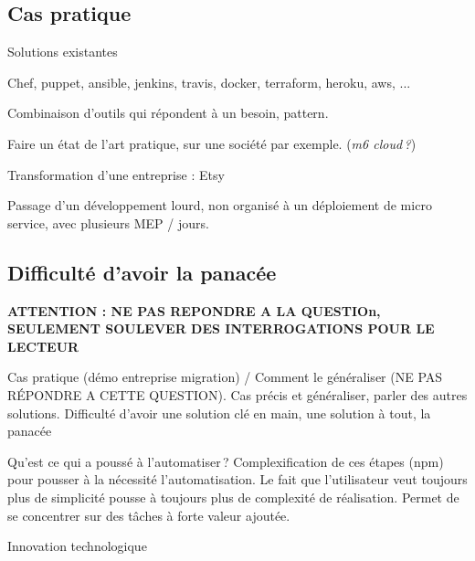 \subsection{Cas pratique}

Solutions existantes

Chef, puppet, ansible, jenkins, travis, docker, terraform, heroku, aws, ...

Combinaison d'outils qui répondent à un besoin, pattern.


Faire un état de l'art pratique, sur une société par exemple. (\textit{m6 cloud ?})

Transformation d'une entreprise : Etsy

Passage d'un développement lourd, non organisé à un déploiement de micro service, avec plusieurs MEP / jours.

\subsection{Difficulté d'avoir la panacée}

\textbf{ATTENTION : NE PAS REPONDRE A LA QUESTIOn, SEULEMENT SOULEVER DES INTERROGATIONS POUR LE LECTEUR}

Cas pratique (démo entreprise migration) / Comment le généraliser (NE PAS RÉPONDRE A CETTE QUESTION). Cas précis et généraliser, parler des autres solutions. Difficulté d'avoir une solution clé en main, une solution à tout, la panacée

Qu'est ce qui a poussé à l'automatiser ? Complexification de ces étapes (npm) pour pousser à la nécessité l'automatisation. Le fait que l'utilisateur veut toujours plus de simplicité pousse à toujours plus de complexité de réalisation. Permet de se concentrer sur des tâches à forte valeur ajoutée.

Innovation technologique 